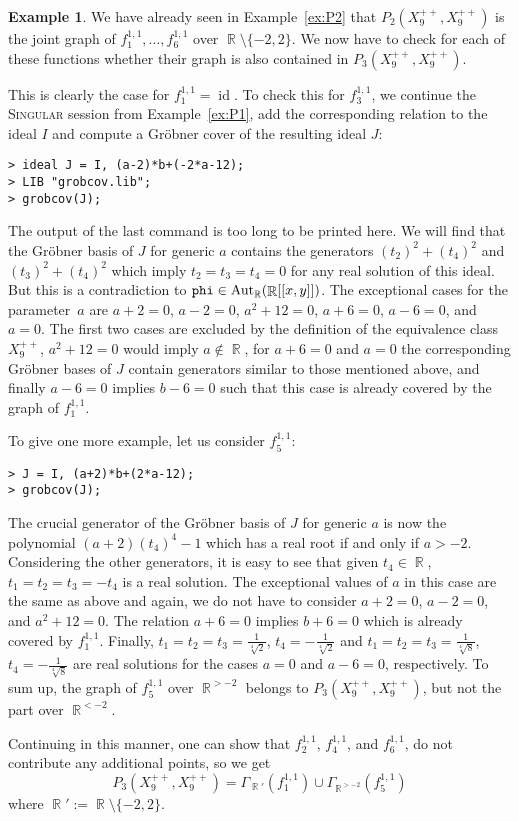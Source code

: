 \documentclass[noend]{amsproc}
\theoremstyle{definition}
\newtheorem{example}[theorem]{Example}
\newcommand{\Singular}{\textsc{Singular}}
\DeclareMathOperator{\R}{\mathbb{R}}
\DeclareMathOperator{\Aut}{Aut}
\DeclareMathOperator{\id}{id}
\begin{document}
\begin{example}
We have already seen in Example~\ref{ex:P2} that
$P_2(X_9^{++}, X_9^{++})$ is the joint graph of
$f_1^{1,1}, \ldots, f_6^{1,1}$ over $\R \setminus \{-2, 2\}$. We now have to
check for each of these functions whether their graph is also contained in
$P_3(X_9^{++}, X_9^{++})$.

This is clearly the case for $f_1^{1,1} = \id$. To check this for $f_3^{1,1}$,
we continue the \Singular{} session from Example~\ref{ex:P1}, add the
corresponding relation to the ideal $I$ and compute a Gr\"obner cover of the
resulting ideal $J$:
\begin{verbatim}
> ideal J = I, (a-2)*b+(-2*a-12);
> LIB "grobcov.lib";
> grobcov(J);
\end{verbatim}
The output of the last command is too long to be printed here. We will find
that the Gr\"obner basis of $J$ for generic $a$ contains the generators
$(t_2)^2+(t_4)^2$ and $(t_3)^2+(t_4)^2$ which imply $t_2 = t_3 = t_4 = 0$ for
any real solution of this ideal. But this is a contradiction to
$\verb+phi+ \in \Aut_{\R}(\R[[x,y]])$. The exceptional cases for the
parameter~$a$ are $a+2=0$, $a-2=0$, $a^2+12=0$, $a+6=0$, $a-6=0$, and $a=0$.
The first two cases are excluded by the definition of the equivalence class
$X_9^{++}$, $a^2+12=0$ would imply $a \not\in \R$, for $a+6=0$ and $a=0$ the
corresponding Gr\"obner bases of $J$ contain generators similar to those
mentioned above, and finally $a-6=0$ implies $b-6=0$ such that this case is
already covered by the graph of $f_1^{1,1}$.

To give one more example, let us consider $f_5^{1,1}$:
\begin{verbatim}
> J = I, (a+2)*b+(2*a-12);
> grobcov(J);
\end{verbatim}
The crucial generator of the Gr\"obner basis of $J$ for generic $a$ is now the
polynomial $(a+2)(t_4)^4-1$ which has a real root if and only if $a > -2$.
Considering the other generators, it is easy to see that given $t_4 \in \R$,
$t_1 = t_2 = t_3 = -t_4$ is a real solution. The exceptional values
of $a$ in this case are the same as above and again, we do not have to consider 
$a+2=0$, $a-2=0$, and $a^2+12=0$. The relation $a+6=0$ implies $b+6=0$ which is
already covered by $f_1^{1,1}$. Finally,
$t_1 = t_2 = t_3 = \frac{1}{\sqrt[4]{2}}$, $t_4 = -\frac{1}{\sqrt[4]{2}}$ and
$t_1 = t_2 = t_3 = \frac{1}{\sqrt[4]{8}}$, $t_4 = -\frac{1}{\sqrt[4]{8}}$ are
real solutions for the cases $a=0$ and $a-6=0$, respectively. To sum up,
the graph of $f_5^{1,1}$ over $\R^{>-2}$ belongs to $P_3(X_9^{++}, X_9^{++})$,
but not the part over $\R^{<-2}$.

Continuing in this manner, one can show that $f_2^{1,1}$, $f_4^{1,1}$, and
$f_6^{1,1}$, do not contribute any additional points, so we get
\[
P_3(X_9^{++}, X_9^{++}) = \Gamma_{\R'} \left(f_1^{1,1}\right)
\cup \Gamma_{\R^{>-2}} \left(f_5^{1,1}\right)
\]
where $\R' := \R \setminus \{-2, 2\}$.
\end{example}
\end{document}
